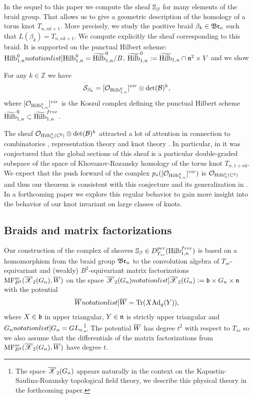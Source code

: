 \documentclass[10pt]{amsart}
\def\ZZ{\mathbb{Z} }
\begin{document}
In the sequel to this paper we  compute the sheaf $\mathbb{S}_\beta$ for many elements of the braid group. That allows us to give a  geometric description of the homology of a torus knot $T_{n,nk+1}$. More precisely,
we study the positive braid $\beta_k\in \mathfrak{Br}_n$ such that  $L(\beta_k)=T_{n,nk+1}$. We compute explicitly the sheaf corresponding to this braid. It is supported on the punctual Hilbert scheme:
$\SymbolPrint{\Hilb_{1,n}^{0}}=\widetilde{\Hilb}^{0}_{1,n}/B$,
$\widetilde{\mathrm{Hilb}}_{1,n}^{0}:=\widetilde{\mathrm{Hilb}}_{1,n}\cap \mathfrak{n}^2\times V$ and we show

\begin{theorem}\cite{OR}\label{thm:Tnk} For any \(k\in \ZZ\) we have
  $$\mathcal{S}_{\beta_k}=[\mathcal{O}_{\mathrm{Hilb}_{1,n}^{0}}]^{vir}\otimes \det(\mathcal{B})^k,$$
  where \([\mathcal{O}_{\mathrm{Hilb}_{1,n}^0}]^{vir}\) is the Koszul complex defining the punctual Hilbert scheme
  \(\widetilde{\mathrm{Hilb}}^0_{1,n}\subset \widetilde{\mathrm{Hilb}}_{1,n}^{free}\).
\end{theorem}

The sheaf $\mathcal{O}_{\mathrm{Hilb}_n^0(\mathbb{C}^2)}\otimes \det(\mathcal{B})^k$
attracted a lot of attention in connection to combinatorics \cite{Hai}, representation theory \cite{GS} and knot theory
\cite{ORS,GORS}. In particular, in \cite{ORS} it was conjectured that the global sections of this sheaf is a particular double-graded subspace  of the
space of Khovanov-Rozansky homology of the torus knot $T_{n,1+nk}$. We expect that the push forward of the complex \(p_*([\mathcal{O}_{\mathrm{Hilb}_{1,n}^0}]^{vir})\) is
\(\mathcal{O}_{\mathrm{Hilb}_n^0(\mathbb{C}^2)}\) and thus
our theorem is consistent with this conjecture and its generalization in \cite{GORS}.
In a forthcoming paper we explore this regular behavior to gain more insight into the behavior of our knot invariant
on large classes of knots.

\subsection{Braids and matrix factorizations}

Our construction  of the complex of sheaves $\mathbb{S}_\beta\in D^{per}_{T_{sc}}(\mathrm{Hilb}_{1,n}^{free})$ is based on a homomorphism from the braid group
$\mathfrak{Br}_n$ to the convolution algebra of \(T_{sc}\)-equivariant and (weakly)  $B^2$-equivariant matrix  factorizations \(\mathrm{MF}^{sc}_{B^2}(\overline{\mathscr{X}}_2(G_n),\overline{W})\) on the space $\SymbolPrint{\calXr_2(G_n)}:=\frb\times G_n\times \frn$ with the potential
$$\SymbolPrint{\Wr}=\Tr(X\Ad_g(Y)),$$
where $X\in \mathfrak{b}$ in upper triangular, $Y\in \mathfrak{n}$ is strictly upper triangular and \(\SymbolPrint{G_n}=GL_n\)\footnote{The space \(\overline{\mathscr{X}}_2(G_n)\) appears naturally in the
  context on the Kapustin-Saulina-Rozansky topological field theory, we describe this physical theory in the forthcoming paper.}. The potential $\overline{W}$ has degree $t^2$ with respect to $T_{sc}$ so we  also assume  that the differentials of the matrix factorizations from
$\mathrm{MF}^{sc}_{B^2}(\overline{\mathscr{X}}_2( G_n),\overline{W})$ have degree $t$.
\end{document}
